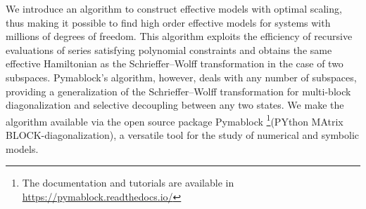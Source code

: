 We introduce an algorithm to construct effective models with optimal scaling, thus making it possible to find high order effective models for systems with millions of degrees of freedom.
This algorithm exploits the efficiency of recursive evaluations of series satisfying polynomial constraints and obtains the same effective Hamiltonian as the Schrieffer--Wolff transformation in the case of two subspaces.
Pymablock's algorithm, however, deals with any number of subspaces, providing a generalization of the Schrieffer--Wolff transformation for multi-block diagonalization and selective decoupling between any two states.
We make the algorithm available via the open source package Pymablock \footnote{The documentation and tutorials are available in \url{https://pymablock.readthedocs.io/}}(PYthon MAtrix BLOCK-diagonalization), a versatile tool for the study of numerical and symbolic models.
